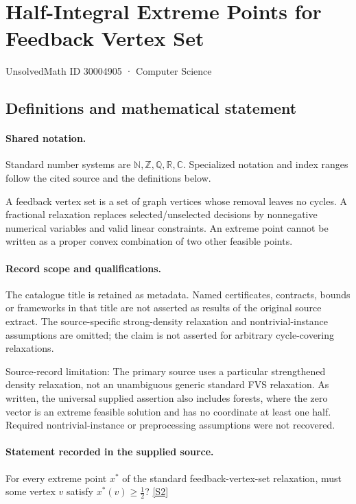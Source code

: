 \documentclass[11pt]{article}
\newcommand{\sref}[2]{\hyperlink{source:#1:#2}{[S#2]}}
\begin{document}
\setcounter{section}{30004904}
\section{Half-Integral Extreme Points for Feedback Vertex Set}\label{30004905}
{\small\sffamily UnsolvedMath ID 30004905 · Computer Science}
\subsection{Definitions and mathematical statement}

\paragraph{Shared notation.}Standard number systems are $\mathbb N,\mathbb Z,\mathbb Q,\mathbb R,\mathbb C$. Specialized notation and index ranges follow the cited source and the definitions below.


A feedback vertex set is a set of graph vertices whose removal leaves no cycles. A fractional relaxation replaces selected/unselected decisions by nonnegative numerical variables and valid linear constraints. An extreme point cannot be written as a proper convex combination of two other feasible points.
\paragraph{Record scope and qualifications.}
The catalogue title is retained as metadata. Named certificates, contracts, bounds or frameworks in that title are not asserted as results of the original source extract.
The source-specific strong-density relaxation and nontrivial-instance assumptions are omitted; the claim is not asserted for arbitrary cycle-covering relaxations.

Source-record limitation: The primary source uses a particular strengthened density relaxation, not an unambiguous generic standard FVS relaxation. As written, the universal supplied assertion also includes forests, where the zero vector is an extreme feasible solution and has no coordinate at least one half. Required nontrivial-instance or preprocessing assumptions were not recovered.
\paragraph{Statement recorded in the supplied source.}
For every extreme point $x^*$ of the standard feedback-vertex-set relaxation, must some vertex $v$ satisfy $x^*(v)\geq\tfrac12$? \sref{30004905}{2}
\end{document}
